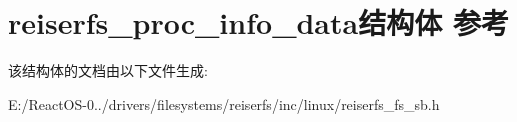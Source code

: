 \hypertarget{structreiserfs__proc__info__data}{}\section{reiserfs\+\_\+proc\+\_\+info\+\_\+data结构体 参考}
\label{structreiserfs__proc__info__data}


该结构体的文档由以下文件生成\+:\begin{DoxyCompactItemize}
\item 
E\+:/\+React\+O\+S-\/0../drivers/filesystems/reiserfs/inc/linux/reiserfs\+\_\+fs\+\_\+sb.\+h\end{DoxyCompactItemize}

